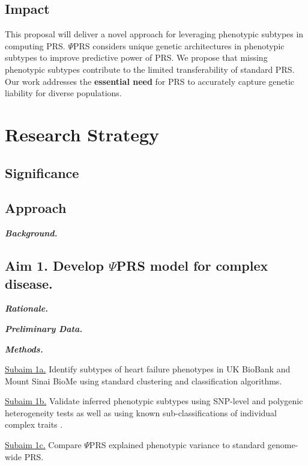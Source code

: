\documentclass[11pt]{article}  %
\newlength\tindent
\renewcommand{\indent}{\hspace*{\tindent}}
\begin{document}
\subsection*{Impact}
This proposal will deliver a novel approach for leveraging phenotypic subtypes in computing PRS. $\Psi$PRS considers unique genetic architectures in phenotypic subtypes to improve predictive power of PRS. We propose that missing phenotypic subtypes contribute to the limited transferability of standard PRS. Our work addresses the \textbf{essential need} for PRS to accurately capture genetic liability for diverse populations.         

\newpage
\section*{Research Strategy}

\subsection*{Significance}

\subsection*{Approach}

\textbf{\textit{Background.}}

\subsection*{Aim 1. Develop $\Psi$PRS model for complex disease.}

\indent \textbf{\textit{Rationale.}}

\indent \textbf{\textit{Preliminary Data.}}

\indent \textbf{\textit{Methods.}}

\indent \underline{Subaim 1a.} Identify subtypes of heart failure phenotypes in UK BioBank and Mount Sinai BioMe using standard clustering and classification algorithms. 

\indent \underline{Subaim 1b.} Validate inferred phenotypic subtypes using SNP-level \cite{dahl_reverse_2019} and polygenic heterogeneity tests \cite{dahl_robust_2020} as well as using known sub-classifications of individual complex traits \cite{li_identification_2015}. 

\indent \underline{Subaim 1c.} Compare $\Psi$PRS explained phenotypic variance to standard genome-wide PRS.
\end{document}

